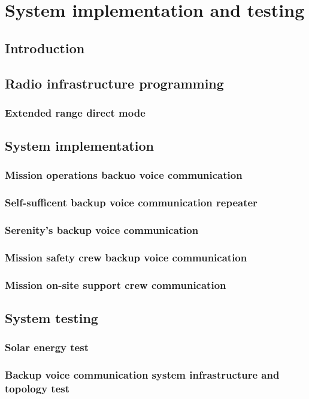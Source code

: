 \chapter{System implementation and testing}

\section{Introduction}

\section{Radio infrastructure programming}
\subsection{Extended range direct mode}

\section{System implementation}
\subsection{Mission operations backuo voice communication}
\subsection{Self-sufficent backup voice communication repeater}
\subsection{Serenity's backup voice communication}
\subsection{Mission safety crew backup voice communication}
\subsection{Mission on-site support crew communication}

\section{System testing}
\subsection{Solar energy test}
\subsection{Backup voice communication system infrastructure and topology test}